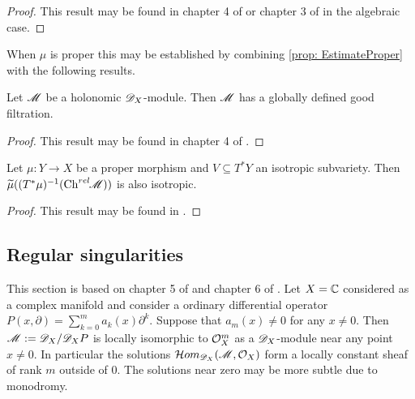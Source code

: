\begin{proof}
  This result may be found in chapter 4 of \cite{sabbah2011introduction} or chapter 3 of \cite{hotta2007d} in the algebraic case.
\end{proof}
When $\mu$ is proper this may be established by combining \cref{prop: EstimateProper} with the following results.
\begin{lemma}
  Let $\mathscr{M}$ be a holonomic $\mathscr{D}_X$-module. Then $\mathscr{M}$ has a globally defined good filtration.
\end{lemma}
\begin{proof}
  This result may be found in chapter 4 of \cite{sabbah2011introduction}.
\end{proof}
\begin{lemma}\label{lem: IsotropicDirectImage}
  Let $\mu:Y\to X$ be a proper morphism and $V\subseteq T^*Y$ an isotropic subvariety. Then $\widetilde{\mu}((T^*\mu)^{-1}(\operatorname{Ch}^{rel}\mkern-5mu \mathscr{M}) )$ is also isotropic.
\end{lemma}
\begin{proof}
  This result may be found in \cite{kashiwara1976b}.
\end{proof}
\subsection{Regular singularities}
This section is based on chapter 5 of \cite{kashiwara2003d} and chapter 6 of \cite{hotta2007d}.
Let $X=\mathbb{C}$ considered as a complex manifold and consider a ordinary differential operator
$P(x,\partial) = \sum_{k=0}^m a_k(x)\partial^k.$
Suppose that $a_m(x)\neq 0$ for any $x\neq 0$.
Then $\mathscr{M} :=\mathscr{D}_X/\mathscr{D}_X P$ is locally isomorphic to $\mathcal{O}_X^m$ as a $\mathscr{D}_X$-module near any point $x\neq 0$.
In particular the solutions $\mathcal{H}om_{\mathscr{D}_X}(\mathscr{M},\mathcal{O}_X)$ form a locally constant sheaf of rank $m$ outside of $0$.
The solutions near zero may be more subtle due to monodromy.

